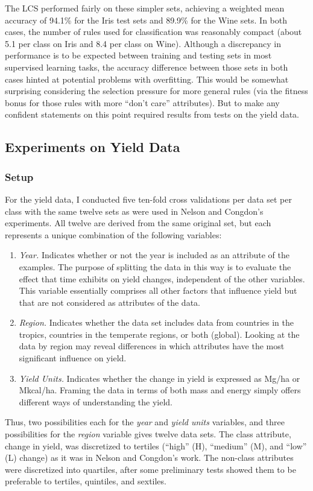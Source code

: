 \documentclass[11pt]{article}
\begin{document}
The LCS performed fairly on these simpler sets, achieving a weighted mean accuracy of 94.1\% for the Iris test sets and 89.9\% for the Wine sets. In both cases, the number of rules used for classification was reasonably compact (about 5.1 per class on Iris and 8.4 per class on Wine). Although a discrepancy in performance is to be expected between training and testing sets in most supervised learning tasks, the accuracy difference between those sets in both cases hinted at potential problems with overfitting. This would be somewhat surprising considering the selection pressure  for more general rules (via the fitness bonus for those rules with more ``don't care'' attributes). But to make any confident statements on this point required results from tests on the yield data.

\subsection{Experiments on Yield Data}

\subsubsection{Setup}
For the yield data, I conducted five ten-fold cross validations per data set per class with the same twelve sets as were used in Nelson and Congdon's experiments. All twelve are derived from the same original set, but each represents a unique combination of the following variables:
\begin{enumerate}
\item \textit{Year.} Indicates whether or not the year is included as an attribute of the examples. The purpose of splitting the data in this way is to evaluate the effect that time exhibits on yield changes, independent of the other variables. This variable essentially comprises all other factors that influence yield but that are not considered as attributes of the data.
\item \textit{Region.} Indicates whether the data set includes data from countries in the tropics, countries in the temperate regions, or both (global). Looking at the data by region may reveal differences in which attributes have the most significant influence on yield.
\item \textit{Yield Units.} Indicates whether the change in yield is expressed as Mg/ha or Mkcal/ha. Framing the data in terms of both mass and energy simply offers different ways of understanding the yield.
\end{enumerate}
Thus, two possibilities  each for the \textit{year} and \textit{yield units} variables, and three possibilities for the \textit{region} variable gives twelve data sets. The class attribute, change in yield, was discretized to tertiles (``high'' (H), ``medium'' (M), and ``low'' (L) change) as it was in Nelson and Congdon's work. The non-class attributes were discretized into quartiles, after some preliminary tests showed them to be preferable to tertiles, quintiles, and sextiles.
\end{document}

